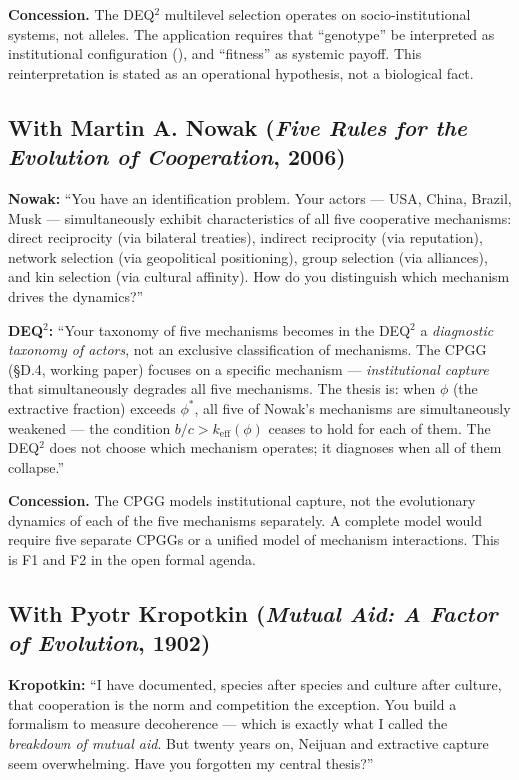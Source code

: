 \textbf{Concession.} The DEQ$^2$ multilevel selection operates on
socio-institutional systems, not alleles. The application requires that
``genotype'' be interpreted as institutional configuration (\Hypoth{}),
and ``fitness'' as systemic payoff. This reinterpretation is stated as
an operational hypothesis, not a biological fact.

\subsection{With Martin A. Nowak (\emph{Five Rules for the Evolution of
Cooperation}, 2006)}\label{con-nowak-2006}

\textbf{Nowak:} ``You have an identification problem. Your actors ---
USA, China, Brazil, Musk --- simultaneously exhibit characteristics of
all five cooperative mechanisms: direct reciprocity (via bilateral
treaties), indirect reciprocity (via reputation), network selection (via
geopolitical positioning), group selection (via alliances), and kin
selection (via cultural affinity). How do you distinguish which mechanism
drives the dynamics?''

\textbf{DEQ$^2$:} ``Your taxonomy of five mechanisms becomes in the
DEQ$^2$ a \emph{diagnostic taxonomy of actors}, not an exclusive
classification of mechanisms. The CPGG (§D.4, working paper) focuses on
a specific mechanism --- \emph{institutional capture} that simultaneously
degrades all five mechanisms. The thesis is: when $\phi$ (the extractive
fraction) exceeds $\phi^*$, all five of Nowak's mechanisms are
simultaneously weakened --- the condition $b/c > k_{\text{eff}}(\phi)$
ceases to hold for each of them. The DEQ$^2$ does not choose which
mechanism operates; it diagnoses when all of them collapse.''

\textbf{Concession.} The CPGG models institutional capture, not the
evolutionary dynamics of each of the five mechanisms separately. A
complete model would require five separate CPGGs or a unified model of
mechanism interactions. This is F1 and F2 in the open formal agenda.

\subsection{With Pyotr Kropotkin (\emph{Mutual Aid: A Factor of
Evolution}, 1902)}\label{con-kropotkin-1902}

\textbf{Kropotkin:} ``I have documented, species after species and
culture after culture, that cooperation is the norm and competition the
exception. You build a formalism to measure decoherence --- which is
exactly what I called the \emph{breakdown of mutual aid}. But twenty
years on, Neijuan and extractive capture seem overwhelming. Have you
forgotten my central thesis?''

